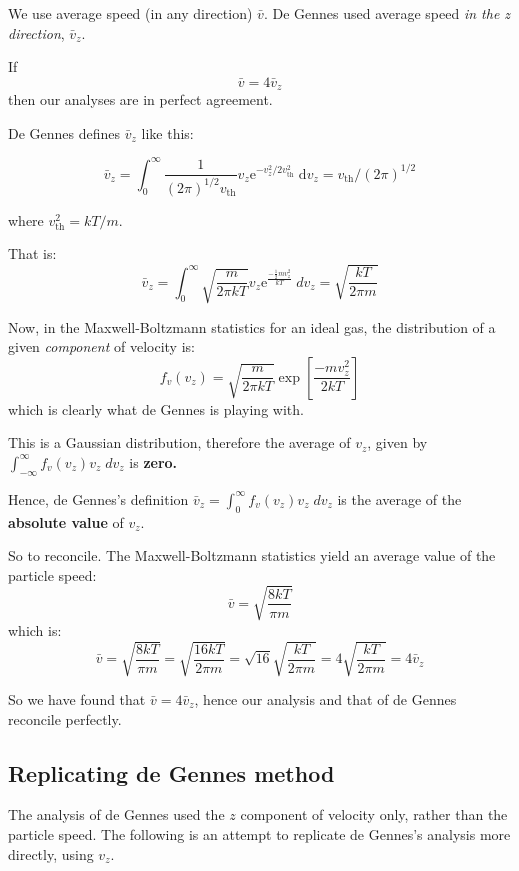 \documentclass{paper}
\begin{document}
We use average speed (in any direction) $\bar{v}$. De Gennes used average speed \emph{in the z direction}, $\bar{v}_{z}$.

If \[ \bar{v} = 4 \bar{v}_{z} \] then our analyses are in perfect agreement.

De Gennes defines $\bar{v}_{z}$ like this:

\[ \bar{v}_{z} = \int_{0}^{\infty} \frac{1}{(2 \pi)^{1/2} v_{\mathrm{th}} }
v_{z} \mathrm{e}^{-v_{z}^{2} / 2v_{\mathrm{th}}^{2}}  \; \mathrm{d} v_{z} = v_{\mathrm{th}} / (2 \pi)^{1/2} \]

where $v_{\mathrm{th}}^{2} =  kT/m $.

That is:
\[ \bar{v}_{z} = \int_{0}^{\infty} \sqrt{\frac{m}{2 \pi k T}} v_{z} 
   \mathrm{e}^{\frac{- \frac{1}{2} m v_{z}^{2}}{kT}} \; dv_{z} = 
   \sqrt{\frac{kT}{2 \pi m}}\]
   
Now, in the Maxwell-Boltzmann statistics for an ideal gas, the distribution of a given \emph{component} of velocity is:
\[ f_{v}(v_{z}) = \sqrt{\frac{m}{2 \pi k T}} \exp
  \left[ \frac{-m v_{z}^{2}}{2 k T} \right] \]
  which is clearly what de Gennes is playing with.


This is a Gaussian distribution, therefore the average of $v_{z}$, given by
$ \int_{- \infty}^{\infty} f_{v}(v_{z}) v_{z} \; dv_{z}  $ is \textbf{zero.}

Hence, de Gennes's definition $\bar{v}_{z} = \int_{0}^{\infty} f_{v}(v_{z}) v_{z} \; dv_{z} $ is the average of the \textbf{absolute value} of $v_{z}$.

\vspace{1em}
So to reconcile.  The Maxwell-Boltzmann statistics yield an average value of the particle speed:
\[ \bar{v} = \sqrt{\frac{8 k T}{\pi m}} \]
which is:
\[ \bar{v} = \sqrt{\frac{8 k T}{\pi m}} = \sqrt{\frac{16 k T}{2 \pi m}}
   = \sqrt{16} \sqrt{\frac{k T}{2 \pi m}} = 4 \sqrt{\frac{k T}{2 \pi m}}
   = 4 \bar{v}_{z} \]
   
So we have found that $ \bar{v} = 4 \bar{v}_{z} $, hence our analysis and that of de Gennes reconcile perfectly.



\subsection*{Replicating de Gennes method}
The analysis of de Gennes used the $z$ component of velocity only, rather than the particle speed.
The following is an attempt to replicate de Gennes's analysis more directly, using $v_{z}$.
\end{document}
